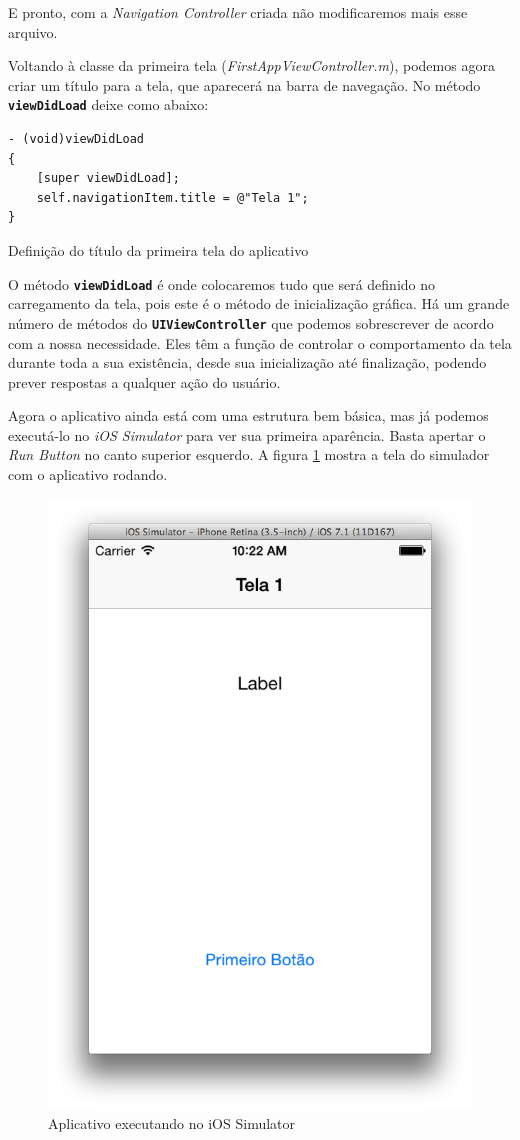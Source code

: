 \documentclass[a4paper,12pt,brazil,doubleside]{book}
\begin{document}
\begin{singlespace}
E pronto, com a \emph{Navigation Controller} criada não modificaremos mais esse arquivo.

Voltando à classe da primeira tela (\emph{FirstAppViewController.m}), podemos agora criar um título para a tela, que aparecerá na barra de navegação. No método \texttt{\textbf{viewDidLoad}} deixe como abaixo:

\begin{listing}[H]
\begin{verbatim}
- (void)viewDidLoad
{
    [super viewDidLoad];
    self.navigationItem.title = @"Tela 1";
}
\end{verbatim}
\caption{Definição do título da primeira tela do aplicativo}
\end{listing}


O método \texttt{\textbf{viewDidLoad}} é onde colocaremos tudo que será definido no carregamento da tela, pois este é o método de inicialização gráfica. Há um grande número de métodos do \texttt{\textbf{UIViewController}} que podemos sobrescrever de acordo com a nossa necessidade. Eles têm a função de controlar o comportamento da tela durante toda a sua existência, desde sua inicialização até finalização, podendo prever respostas a qualquer ação do usuário.

Agora o aplicativo ainda está com uma estrutura bem básica, mas já podemos executá-lo no \emph{iOS Simulator} para ver sua primeira aparência. Basta apertar o \emph{Run Button} no canto superior esquerdo. A figura \ref{fig:app_executanto1} mostra a tela do simulador com o aplicativo rodando.

\begin{figure}[H]
  \centering
  \includegraphics[width=.55\textwidth]{figuras/3/tela_novo_projeto_26.png}
  \caption{Aplicativo executando no iOS Simulator}
  \label{fig:app_executanto1}
\end{figure}


\end{singlespace}
\end{document}

